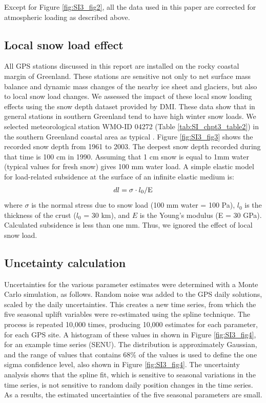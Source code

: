 Except for Figure \ref{fig:SI3_fig2}, all the data used in this paper are corrected for atmospheric loading as described above.

\subsection*{Local snow load effect}
All GPS stations discussed in this report are installed on the rocky coastal margin of Greenland. These stations are sensitive not only to net surface mass balance and dynamic mass changes of the nearby ice sheet and glaciers, but also to local snow load changes.  We assessed the impact of these local snow loading effects using the snow depth dataset provided by DMI.  These data show that in general stations in southern Greenland tend to have high winter snow loads.  We selected meteorological station WMO-ID 04272 (Table \ref{tab:SI_chpt3_table2}) in the southern Greenland coastal area as typical \cite[]{carstensen2011app}. Figure \ref{fig:SI3_fig3} shows the recorded snow depth from 1961 to 2003.  The deepest snow depth recorded during that time is 100 cm in 1990. Assuming that 1 cm snow is equal to 1mm water (typical values for fresh snow) gives 100 mm water load.  A simple elastic model for load-related subsidence   at the surface of an infinite elastic medium is:
\begin{equation} \label{eq:SI_chpt3_5}
\begin{aligned}
dl=\sigma \cdot l_{0}/\textup{E}
\end{aligned}
\end{equation}
where $\sigma$ is the normal stress due to snow load (100 mm water = 100 Pa), $l_{0}$ is the thickness of the crust ($l_{0}$ = 30 km), and $E$ is the Young's modulus (E = 30 GPa).  Calculated subsidence is less than one mm. Thus, we ignored the effect of local snow load.

\subsection*{Uncetainty calculation}
Uncertainties for the various parameter estimates were determined with a Monte Carlo simulation, as follows. Random noise was added to the GPS daily solutions, scaled by the daily uncertainties.  This creates a new time series, from which the five seasonal uplift variables were re-estimated using the spline technique.  The process is repeated 10,000 times, producing 10,000 estimates for each parameter, for each GPS site.  A histogram of these values in shown in Figure \ref{fig:SI3_fig4}, for an example time series (SENU).   The distribution is approximately Gaussian, and the range of values that contains 68\% of the values is used to define the one sigma confidence level, also shown in Figure \ref{fig:SI3_fig4}.  The uncertainty analysis shows that the spline fit, which is sensitive to seasonal variations in the time series, is not sensitive to random daily position changes in the time series. As a results, the estimated uncertainties of the five seasonal parameters are small.

